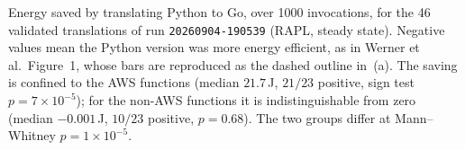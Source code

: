 \caption{Energy saved by translating Python to Go, over 1000 invocations, for the
  46 validated translations of run \texttt{20260904-190539} (RAPL, steady
  state). Negative values mean the Python version was more energy efficient, as
  in Werner et al.\ Figure~1, whose bars are reproduced as the dashed outline
  in~(a). The saving is confined to the AWS functions (median $21.7$\,J,
  $21/23$ positive, sign test $p=7 \times 10^{-5}$); for the non-AWS functions it is
  indistinguishable from zero (median $-0.001$\,J, $10/23$ positive,
  $p=0.68$). The two groups differ at Mann--Whitney $p=1 \times 10^{-5}$.}
